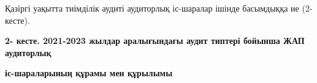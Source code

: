 Қазіргі уақытта тиімділік аудиті аудиторлық іс-шаралар ішінде басымдыққа
ие (2-кесте).

{\bfseries 2- кесте. 2021-2023 жылдар аралығындағы аудит типтері бойынша
ЖАП аудиторлық}

{\bfseries іс-шараларының құрамы мен құрылымы}


